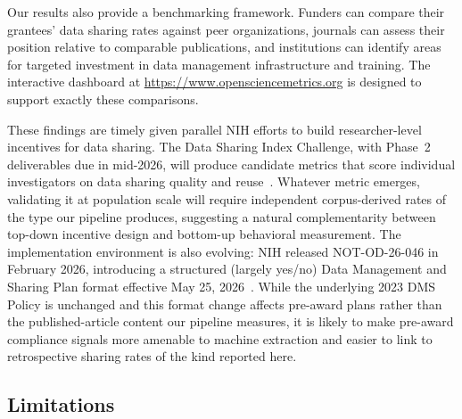 Our results also provide a benchmarking framework. Funders can compare their grantees' data sharing rates against peer organizations, journals can assess their position relative to comparable publications, and institutions can identify areas for targeted investment in data management infrastructure and training. The interactive dashboard at \url{https://www.opensciencemetrics.org} is designed to support exactly these comparisons.

These findings are timely given parallel NIH efforts to build researcher-level incentives for data sharing. The Data Sharing Index Challenge, with Phase~2 deliverables due in mid-2026, will produce candidate metrics that score individual investigators on data sharing quality and reuse~\cite{NEI2025sindex,Frank2024-dm}. Whatever metric emerges, validating it at population scale will require independent corpus-derived rates of the type our pipeline produces, suggesting a natural complementarity between top-down incentive design and bottom-up behavioral measurement. The implementation environment is also evolving: NIH released NOT-OD-26-046 in February 2026, introducing a structured (largely yes/no) Data Management and Sharing Plan format effective May 25, 2026~\cite{National-Institutes-of-Health2026-kg}. While the underlying 2023 DMS Policy is unchanged and this format change affects pre-award plans rather than the published-article content our pipeline measures, it is likely to make pre-award compliance signals more amenable to machine extraction and easier to link to retrospective sharing rates of the kind reported here.

\subsection{Limitations}

